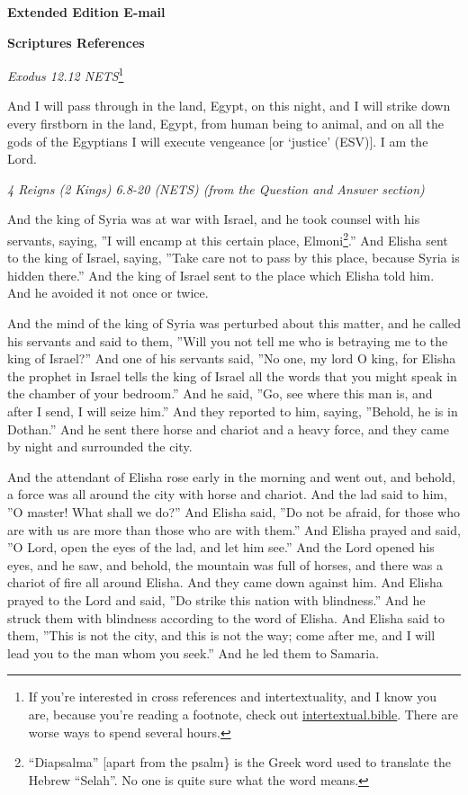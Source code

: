 \documentclass[
]{article}
\newcommand{\RL}[1]{\beginR #1\endR}
\begin{document}
\textbf{Extended Edition E-mail}

\textbf{Scriptures References}

\emph{Exodus 12.12 NETS}\footnote{If you're interested in cross
  references and intertextuality, and I know you are, because you're
  reading a footnote, check out
  \href{http://intertextual.bible}{\ul{intertextual.bible}}. There are
  worse ways to spend several hours.}

And I will pass through in the land, Egypt, on this night, and I will
strike down every firstborn in the land, Egypt, from human being to
animal, and on all the gods of the Egyptians I will execute vengeance
{[}or `justice' (ESV){]}. I am the Lord.

\emph{4 Reigns (2 Kings) 6.8-20 (NETS) (from the Question and Answer
section)}

And the king of Syria was at war with Israel, and he took counsel with
his servants, saying, \RL{''}I will encamp at this certain place,
Elmoni\footnote{``Diapsalma'' {[}apart from the psalm\} is the Greek
  word used to translate the Hebrew ``Selah''. No one is quite sure what
  the word means.}.'' And Elisha sent to the king of Israel, saying,
\RL{''}Take care not to pass by this place, because Syria is hidden
there.'' And the king of Israel sent to the place which Elisha told him.
And he avoided it not once or twice.

And the mind of the king of Syria was perturbed about this matter, and
he called his servants and said to them, \RL{''}Will you not tell me who
is betraying me to the king of Israel?'' And one of his servants said,
\RL{''}No one, my lord O king, for Elisha the prophet in Israel tells
the king of Israel all the words that you might speak in the chamber of
your bedroom.'' And he said, \RL{''}Go, see where this man is, and after
I send, I will seize him.'' And they reported to him, saying,
\RL{''}Behold, he is in Dothan.'' And he sent there horse and chariot
and a heavy force, and they came by night and surrounded the city.

And the attendant of Elisha rose early in the morning and went out, and
behold, a force was all around the city with horse and chariot. And the
lad said to him, \RL{''}O master! What shall we do?'' And Elisha said,
\RL{''}Do not be afraid, for those who are with us are more than those
who are with them.'' And Elisha prayed and said, \RL{''}O Lord, open the
eyes of the lad, and let him see.'' And the Lord opened his eyes, and he
saw, and behold, the mountain was full of horses, and there was a
chariot of fire all around Elisha. And they came down against him. And
Elisha prayed to the Lord and said, \RL{''}Do strike this nation with
blindness.'' And he struck them with blindness according to the word of
Elisha. And Elisha said to them, \RL{''}This is not the city, and this
is not the way; come after me, and I will lead you to the man whom you
seek.'' And he led them to Samaria.
\end{document}

